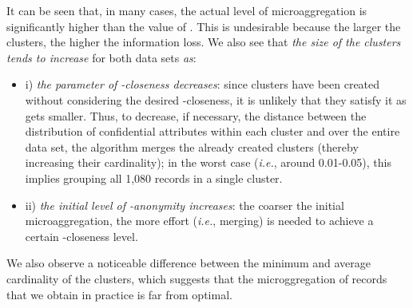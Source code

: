 \documentclass[10pt,journal,compsoc]{IEEEtran}
\theoremstyle{definition}
\theoremstyle{plain}
\begin{document}
It can be seen that, in many cases, the actual level of microaggregation
is significantly higher than the value of . This is undesirable because 
the larger the clusters, the higher the information loss. 
We also see that {\em the size of the clusters tends to increase} for both data sets {\em as}:
\begin {itemize}
\item i) {\em the parameter  of  -closeness decreases}: since clusters have been created without
considering the desired -closeness, it is unlikely that 
they satisfy it as  gets smaller. 
Thus, to decrease, if necessary, the distance between
the distribution of confidential attributes within each cluster and 
over the entire data set,
the algorithm merges the already created clusters (thereby 
increasing their cardinality);
in the worst case ({\em i.e.},  around 0.01-0.05), this implies grouping all 1,080 records in a single cluster.  
\item ii) {\em the initial level of -anonymity increases}: the coarser the initial microaggregation,  
the more effort ({\em i.e.}, merging) is needed to achieve a certain -closeness level. 
\end {itemize}

We also observe a noticeable difference between the minimum and average cardinality of the
clusters, which suggests that the microggregation of records that we obtain in practice
is far from optimal.
\end{document}
